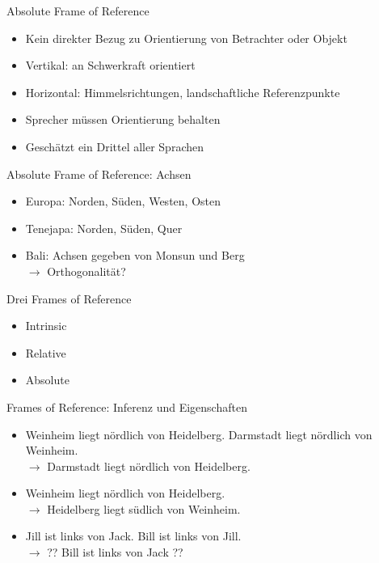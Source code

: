 \documentclass[12pt,a4paper]{beamer}
\begin{document}
\begin{frame}{Absolute Frame of Reference}
\begin{itemize}
\item Kein direkter Bezug zu Orientierung von Betrachter oder Objekt
\item Vertikal: an Schwerkraft orientiert
\item Horizontal: Himmelsrichtungen, landschaftliche Referenzpunkte
\item Sprecher müssen Orientierung behalten
\item Geschätzt ein Drittel aller Sprachen
\end{itemize}
\end{frame}


\begin{frame}{Absolute Frame of Reference: Achsen}
\begin{itemize}
\item Europa: Norden, Süden, Westen, Osten
\item Tenejapa: Norden, Süden, Quer
\item Bali: Achsen gegeben von Monsun und Berg \\
$\to$ Orthogonalität?
\end{itemize}
\end{frame}


\begin{frame}{Drei Frames of Reference}
\begin{itemize}
\item Intrinsic
\item Relative
\item Absolute
\end{itemize}
\end{frame}


\begin{frame}{Frames of Reference: Inferenz und Eigenschaften}
\begin{itemize}
\item Weinheim liegt nördlich von Heidelberg. Darmstadt liegt nördlich von Weinheim. \\
$\to$ Darmstadt liegt nördlich von Heidelberg.
\item Weinheim liegt nördlich von Heidelberg. \\
$\to$ Heidelberg liegt südlich von Weinheim.
\item Jill ist links von Jack. Bill ist links von Jill. \\
$\to$ ?? Bill ist links von Jack ??
\end{itemize}
\end{frame}
\end{document}
